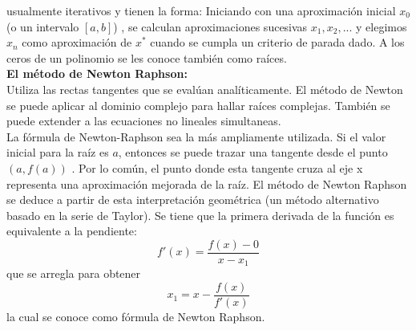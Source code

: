 \documentclass[12pt]{article}
\begin{document}
			usualmente iterativos y tienen la forma: Iniciando con una aproximación inicial $ x_0 $ (o un intervalo $ [a,b] $) , 
			se calculan aproximaciones sucesivas $ x_1,x_2,... $ y elegimos $ x_n $ como aproximación de $ x^* $ cuando se cumpla un 
			criterio de parada dado. A los ceros de un polinomio se les conoce también como raíces.\\
			\textbf{El método de Newton Raphson:}\\
			Utiliza las rectas tangentes que se evalúan analíticamente. El método de Newton se puede aplicar 
			al dominio complejo para hallar raíces complejas. También se puede extender a las ecuaciones no 
			lineales simultaneas. \cite{bib:item3} \\
			La fórmula de Newton-Raphson sea la más ampliamente utilizada. Si el valor inicial para la raíz es 
			$ a $, entonces se puede trazar una tangente desde el punto $ (a,f(a)) $ . Por lo común, el punto donde 
			esta tangente cruza al eje x representa una aproximación mejorada de la raíz. El método de Newton 
			Raphson se deduce a partir de esta interpretación geométrica (un método alternativo basado en la 
			serie de Taylor). Se tiene que la primera derivada de la función es equivalente a la pendiente: 
			$$ f'(x) = \frac{f(x)-0}{x-x_1} $$ que se arregla para obtener $$ x_1 = x - \frac{f(x)}{f'(x)} $$ 
			la cual se conoce como fórmula de Newton Raphson. \cite{bib:item4}
\end{document}
